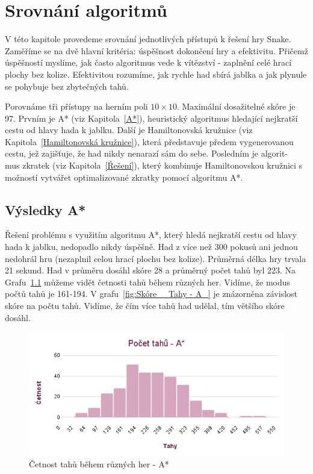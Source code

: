\chapter{Srovnání algoritmů}\label{Srovnání algoritmů}

V této kapitole provedeme srovnání jednotlivých přístupů k řešení hry Snake. Zaměříme se na dvě hlavní kritéria: úspěšnost dokončení hry a efektivitu. Přičemž úspěšností myslíme, jak často algoritmus vede k vítězství - zaplnění celé hrací plochy bez kolize. Efektivitou rozumíme, jak rychle had sbírá jablka a jak plynule se pohybuje bez zbytečných tahů.

Porovnáme tři přístupy na herním poli \(10 \times 10\). Maximální dosažitelné skóre je 97. Prvním je A* (viz Kapitola~\ref{A*}), heuristický algoritmus hledající nejkratší cestu od hlavy hada k jablku. Další je Hamiltonovská kružnice (viz Kapitola~\ref{Hamiltonovská kružnice}), která představuje předem vygenerovanou cestu, jež zajišťuje, že had nikdy nenarazí sám do sebe. Posledním je algorit-\\mus zkratek (viz Kapitola~\ref{Řešení}), který kombinuje Hamiltonovskou kružnici s možností vytvářet optimalizované zkratky pomocí algoritmu A*.

\section{Výsledky A*}

Řešení problému s využitím algoritmu A*, který hledá nejkratší cestu od hlavy hada k jablku, nedopadlo nikdy úspěšně. Had z více než 300 pokusů ani jednou nedohrál hru (nezaplnil celou hrací plochu bez kolize). Průměrná délka hry trvala 21 sekund. Had v průměru dosáhl skóre 28 a průměrný počet tahů byl 223. Na Grafu~\ref{fig:Počet tahů - A_} můžeme vidět četnosti tahů během různých her. Vidíme, že modus počtů tahů je 161-194. V grafu~\ref{fig:Skóre _ Tahy - A_} je znázorněna závislost skóre na počtu tahů. Vidíme, že čím více tahů had udělal, tím většího skóre dosáhl.

\begin{figure}[H]
    \centering
    \includegraphics[width=\linewidth]{Images/Počet tahů - A_.png}
    \caption{Četnost tahů během různých her - A*}
    \label{fig:Počet tahů - A_}
\end{figure}

